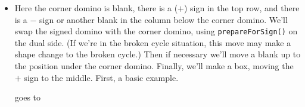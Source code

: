 \documentclass[12pt]{article}
\numberwithin{equation}{section}
\newcommand{\horizontalDominoRSShift}[4]{\filldraw [dominoRSStyle] (#2 - 1 + #4 + \eps, #1 - 1 + \eps) rectangle + (2 - \teps, 1 -\teps) node [dominoText] {$#3$};}
\newcommand{\verticalDominoRSShift}[4]{\filldraw [dominoRSStyle] (#2 - 1 + #4 + \eps,  #1 - 1 + \eps) rectangle + (1 - \teps,2 -\teps) node [dominoText] {$#3$};}
\begin{document}
\begin{itemize}
\begin{itemize}
      \item Here the corner domino is blank, there is a ($+$) sign in the top row, and there is a $-$ sign or another blank in the column below the corner domino.
      We'll swap the signed domino with the corner domino, using \texttt{prepareForSign()} on the dual side. (If we're in the broken cycle situation, this move may make a shape change to the broken cycle.)
      Then if necessary we'll move a blank up to the position under the corner domino.
      Finally, we'll make a box, moving the $+$ sign to the middle.
      First, a basic example.
      \begin{figure}[H]
        \centering
      \end{figure}
      goes to
      \begin{figure}[H]
        \centering
\end{figure}
\end{itemize}
\end{itemize}
\end{document}
